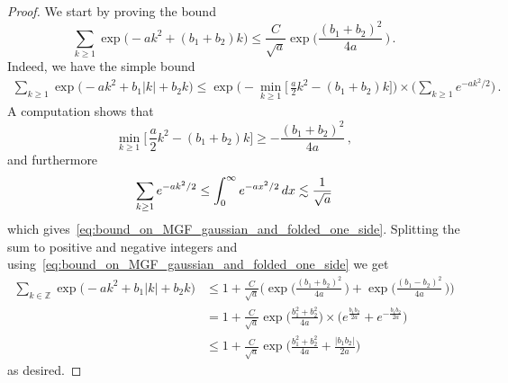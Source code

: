 \documentclass[11pt]{amsart}
\theoremstyle{definition}
\theoremstyle{remark}
\numberwithin{equation}{section}
\begin{document}
	\begin{proof}
		We start by proving the bound
		\begin{equation}
			\label{eq:bound_on_MGF_gaussian_and_folded_one_side}
			\sum_{k\ge 1} \exp\Big(-ak^2+(b_1 + b_2)k \Big) \le \frac{C}{\sqrt{a}} \exp\Big(\frac{(b_1+b_2)^2}{4a}\, \Big) \, .
		\end{equation}
		Indeed, we have the simple bound
		\begin{align*}
			\sum_{k\ge 1} \exp\Big(-ak^2+b_1|k| + b_2 k \Big) \le \exp\Big(-\min_{k\ge 1} \Big[ \, \frac{a}{2}k^2 - (b_1+b_2) k\Big]\Big) \times\Big(\sum_{k\ge 1} e^{-ak^2/2}\Big) \, .
		\end{align*}
		A computation shows that
		\[
		\min_{k\ge 1} \Big[ \, \frac{a}{2}k^2 - (b_1+b_2) k\Big] \ge -\frac{(b_1+b_2)^2}{4a} \, ,
		\]
		and furthermore
		\[
		\sum_{k\ge 1} e^{-ak^2/2} \le \int_{0}^{\infty} e^{-ax^2/2} \, {\rm d}x \lesssim \frac{1}{\sqrt{a}} 
		\]
		which gives~\eqref{eq:bound_on_MGF_gaussian_and_folded_one_side}. Splitting the sum to positive and negative integers and using~\eqref{eq:bound_on_MGF_gaussian_and_folded_one_side} we get
		\begin{align*}
			\sum_{k\in \mathbb{Z}} \exp\Big(-ak^2+b_1|k| + b_2 k \Big) &\le 1 + \frac{C}{\sqrt{a}} \Big(\exp\Big(\frac{(b_1+b_2)^2}{4a}\, \Big) + \exp\Big(\frac{(b_1-b_2)^2}{4a}\, \Big)\Big) \\ &= 1 + \frac{C}{\sqrt{a}} \exp\Big(\frac{b_1^2 + b_2^2}{4a}\Big) \times\Big(e^{\frac{b_1b_2}{2a}} + e^{-\frac{b_1b_2}{2a}}\Big) \\ & \le 1+ \frac{C}{\sqrt{a}} \exp\Big(\frac{b_1^2 + b_2^2}{4a} + \frac{|b_1 b_2|}{2a}\Big)
		\end{align*}
		as desired.
	\end{proof}
\end{document}
